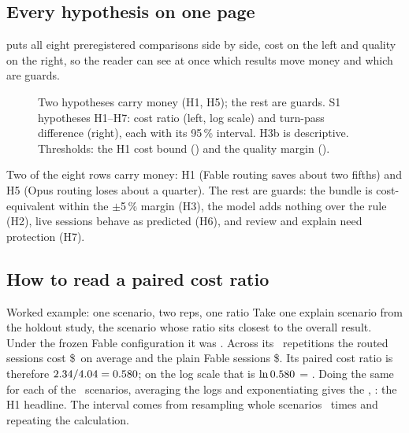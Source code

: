 \subsection{Every hypothesis on one page}

 puts all eight preregistered comparisons side by side, cost on the left and quality on the right, so the reader can see at once which results move money and which are guards.

\begin{figure}[htbp]
\centering
{}\par\smallskip

\caption{Two hypotheses carry money (H1, H5); the rest are guards. S1 hypotheses H1--H7: cost ratio (left, log scale) and turn-pass difference (right), each with its 95\,\%
interval. H3b is descriptive. Thresholds: the H1 cost bound (\SThreshOne) and the quality margin (\NIMargin).}
\label{fig:s1forest}
\end{figure}

\begin{keyidea}
Two of the eight rows carry money: H1 (Fable routing saves about two fifths) and H5 (Opus routing loses about a
quarter). The rest are guards: the bundle is cost-equivalent within the \(\pm\)5\,\% margin (H3), the model adds nothing over the rule (H2), live sessions behave as
predicted (H6), and review and explain need protection (H7).
\end{keyidea}

\subsection{How to read a paired cost ratio}\label{sec:worked}

\begin{casecard}{Worked example: one scenario, two reps, one ratio}
Take one explain scenario from the holdout study, the scenario whose ratio sits closest to the overall result. Under the frozen Fable
configuration it was \WxArm. Across its \WxReps\ repetitions the routed sessions cost \$\WxRouted\ on average and the
plain Fable sessions \$\WxPlain. Its paired cost ratio is therefore $2.34 / 4.04 = 0.580$; on the log scale
that is $\ln 0.580$ = \WxLog. Doing the same for each of the \WxNScen\ scenarios, averaging the logs and
exponentiating gives the , \WxGM: the H1 headline. The interval comes from resampling whole
scenarios \SResamples\ times and repeating the calculation.
\end{casecard}


